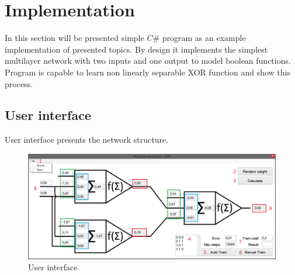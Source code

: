 \section{Implementation}
\label{Implementation}

In this section will be presented simple $C\#$ program as an example implementation of presented topics.
By design it implements the simplest multilayer network with two inputs and one output to model boolean functions.
Program is capable to learn non linearly separable XOR function and show this process.

\subsection{User interface}
\label{UserInterface}

User interface presents the network structure.

\begin{figure}[!h]
    \centering
    \includegraphics[scale=0.45]{Media/UI_numbers.png}
    \caption{User interface}
    \label{fig:UI}
\end{figure}

